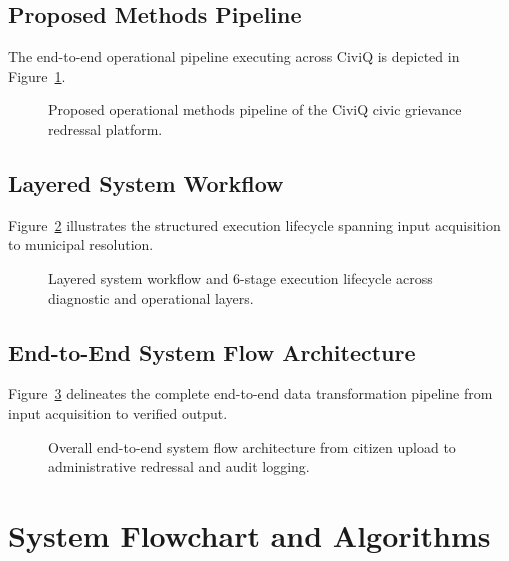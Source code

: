 \documentclass[12pt,a4paper]{report}
\begin{document}
\subsection{Proposed Methods Pipeline}
The end-to-end operational pipeline executing across CiviQ is depicted in Figure~\ref{fig:framework}.

\begin{figure}[H]
    \centering
    \caption{Proposed operational methods pipeline of the CiviQ civic grievance redressal platform.}
    \label{fig:framework}
\end{figure}

\subsection{Layered System Workflow}
Figure~\ref{fig:arch_workflow} illustrates the structured execution lifecycle spanning input acquisition to municipal resolution.

\begin{figure}[H]
    \centering
    \caption{Layered system workflow and 6-stage execution lifecycle across diagnostic and operational layers.}
    \label{fig:arch_workflow}
\end{figure}

\subsection{End-to-End System Flow Architecture}
Figure~\ref{fig:system_flow} delineates the complete end-to-end data transformation pipeline from input acquisition to verified output.

\begin{figure}[H]
    \centering
    \caption{Overall end-to-end system flow architecture from citizen upload to administrative redressal and audit logging.}
    \label{fig:system_flow}
\end{figure}

\section{System Flowchart and Algorithms}
\end{document}
